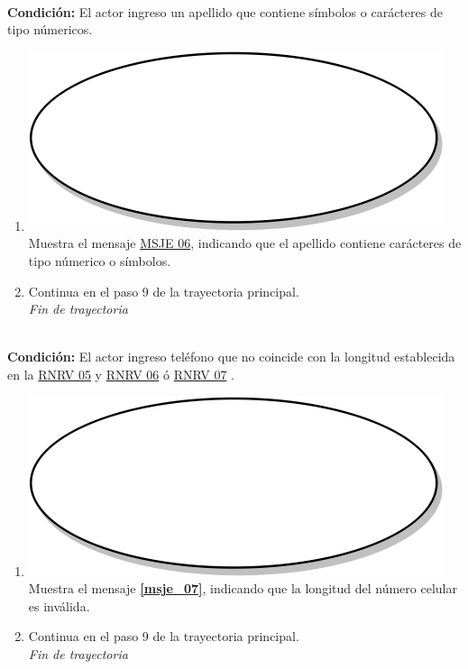 \textbf{} \\
\textbf{Condición:} El actor ingreso un apellido que contiene símbolos o carácteres de tipo númericos.\\
 \begin{enumerate}[label=E\arabic*]
    \item {\includegraphics[scale=.05]{Capitulo3/img/proceso.png} Muestra el mensaje \hyperref[msje_06]{MSJE 06}, indicando que el apellido contiene carácteres de tipo númerico o símbolos.}
    \item {Continua en el paso 9 de la trayectoria principal.} \\
    \textit{Fin de trayectoria} \\
\end{enumerate}

\textbf{} \\
\textbf{Condición:} El actor ingreso teléfono que no coincide con la longitud establecida en la \hyperref[rnrv_05]{RNRV 05} y \hyperref[rnrv_06]{RNRV 06} ó \hyperref[rnrv_07]{RNRV 07} .\\
 \begin{enumerate}[label=F\arabic*]
    \item {\includegraphics[scale=.05]{Capitulo3/img/proceso.png} Muestra el mensaje \textbf{\ref{msje_07}}, indicando que la longitud del número celular es inválida.}
    \item {Continua en el paso 9 de la trayectoria principal.} \\
    \textit{Fin de trayectoria} \\
\end{enumerate}
